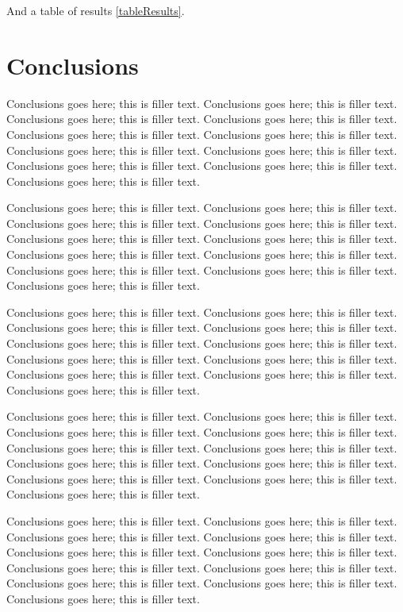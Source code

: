 \documentclass{sig-alternate}
\begin{document}
And a table of results \ref{tableResults}.



\section{Conclusions}

Conclusions goes here; this is filler text. Conclusions goes here; this is filler text. Conclusions goes here; this is filler text. Conclusions goes here; this is filler text. Conclusions goes here; this is filler text. Conclusions goes here; this is filler text. Conclusions goes here; this is filler text. Conclusions goes here; this is filler text. Conclusions goes here; this is filler text. Conclusions goes here; this is filler text. Conclusions goes here; this is filler text. 

Conclusions goes here; this is filler text. Conclusions goes here; this is filler text. Conclusions goes here; this is filler text. Conclusions goes here; this is filler text. Conclusions goes here; this is filler text. Conclusions goes here; this is filler text. Conclusions goes here; this is filler text. Conclusions goes here; this is filler text. Conclusions goes here; this is filler text. Conclusions goes here; this is filler text. Conclusions goes here; this is filler text. 

Conclusions goes here; this is filler text. Conclusions goes here; this is filler text. Conclusions goes here; this is filler text. Conclusions goes here; this is filler text. Conclusions goes here; this is filler text. Conclusions goes here; this is filler text. Conclusions goes here; this is filler text. Conclusions goes here; this is filler text. Conclusions goes here; this is filler text. Conclusions goes here; this is filler text. Conclusions goes here; this is filler text. 

Conclusions goes here; this is filler text. Conclusions goes here; this is filler text. Conclusions goes here; this is filler text. Conclusions goes here; this is filler text. Conclusions goes here; this is filler text. Conclusions goes here; this is filler text. Conclusions goes here; this is filler text. Conclusions goes here; this is filler text. Conclusions goes here; this is filler text. Conclusions goes here; this is filler text. Conclusions goes here; this is filler text. 

Conclusions goes here; this is filler text. Conclusions goes here; this is filler text. Conclusions goes here; this is filler text. Conclusions goes here; this is filler text. Conclusions goes here; this is filler text. Conclusions goes here; this is filler text. Conclusions goes here; this is filler text. Conclusions goes here; this is filler text. Conclusions goes here; this is filler text. Conclusions goes here; this is filler text. Conclusions goes here; this is filler text. 
\end{document}

